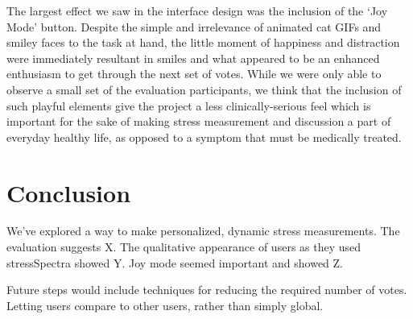 \documentclass{sigchi}
\begin{document}
The largest effect we saw in the interface design was the inclusion of the ‘Joy Mode’ button. Despite the simple and irrelevance of animated cat GIFs and smiley faces to the task at hand, the little moment of happiness and distraction were immediately resultant in smiles and what appeared to be an enhanced enthusiasm to get through the next set of votes. While we were only able to observe a small set of the evaluation participants, we think that the inclusion of such playful elements give the project a less clinically-serious feel which is important for the sake of making stress measurement and discussion a part of everyday healthy life, as opposed to a symptom that must be medically treated. 

\section{Conclusion}
We’ve explored a way to make personalized, dynamic stress measurements. The evaluation suggests X. The qualitative appearance of users as they used stressSpectra showed Y. Joy mode seemed important and showed Z.


Future steps would include techniques for reducing the required number of votes. Letting users compare to other users, rather than simply global. 




\balance




\end{document}
